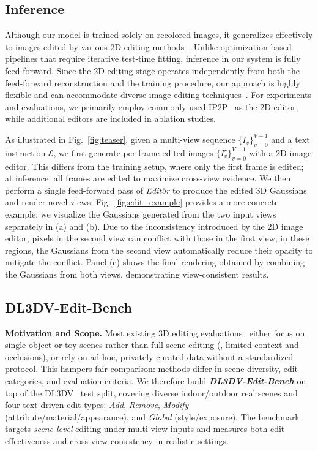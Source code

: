 \documentclass[10pt,twocolumn,letterpaper]{article}
\newcommand{\ourmethod}{\textit{Edit3r}}
\newcommand{\ourbench}{\textit{DL3DV-Edit-Bench}}
\begin{document}
\subsection{Inference}
Although our model is trained solely on recolored images, it generalizes effectively to images edited by various 2D editing methods~\cite{ip2p, labs2025flux1kontextflowmatching}.  
Unlike optimization-based pipelines that require iterative test-time fitting, inference in our system is fully feed-forward.  
Since the 2D editing stage operates independently from both the feed-forward reconstruction and the training procedure, our approach is highly flexible and can accommodate diverse image editing techniques~\cite{gpt4o, labs2025flux1kontextflowmatching, geminiteam2025geminifamilyhighlycapable}.  
For experiments and evaluations, we primarily employ commonly used IP2P~\cite{ip2p} as the 2D editor, while additional editors are included in ablation studies.  

As illustrated in Fig.~\ref{fig:teaser}, given a multi-view sequence \(\{I_v\}_{v=0}^{V-1}\) and a text instruction \(\mathcal{E}\), we first generate per-frame edited images \(\{I_v^\star\}_{v=0}^{V-1}\) with a 2D image editor.  
This differs from the training setup, where only the first frame is edited; at inference, all frames are edited to maximize cross-view evidence.  
We then perform a single feed-forward pass of {\ourmethod} to produce the edited 3D Gaussians and render novel views.
Fig.~\ref{fig:edit_example} provides a more concrete example: we visualize the Gaussians generated from the two input views separately in (a) and (b). 
Due to the inconsistency introduced by the 2D image editor, pixels in the second view can conflict with those in the first view; in these regions, the Gaussians from the second view automatically reduce their opacity to mitigate the conflict. 
Panel (c) shows the final rendering obtained by combining the Gaussians from both views, demonstrating view-consistent results.

\subsection{DL3DV-Edit-Bench}
\vspace{1mm}
\noindent\textbf{Motivation and Scope.}
Most existing 3D editing evaluations~\cite{in2n} either focus on single-object or toy scenes rather than full scene editing (\eg, limited context and occlusions), or rely on ad-hoc, privately curated data without a standardized protocol. This hampers fair comparison: methods differ in scene diversity, edit categories, and evaluation criteria. 
We therefore build \textbf{{\ourbench}} on top of the DL3DV~\cite{ling2023dl3dv10klargescalescenedataset} test split, covering diverse indoor/outdoor real scenes and four text-driven edit types: \emph{Add}, \emph{Remove}, \emph{Modify} (attribute/material/appearance), and \emph{Global} (style/exposure). The benchmark targets \emph{scene-level} editing under multi-view inputs and measures both edit effectiveness and cross-view consistency in realistic settings.
\end{document}
